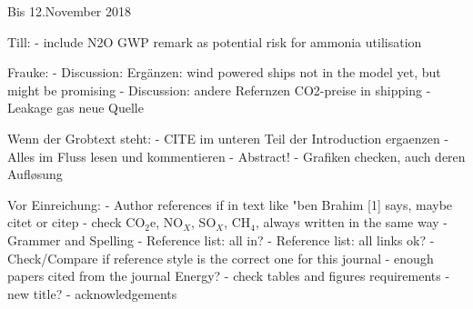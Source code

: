 Bis 12.November 2018

Till:
- include N2O GWP remark as potential risk for ammonia utilisation

Frauke:
- Discussion: Ergänzen: wind powered ships not in the model yet, but might be promising
- Discussion: andere Refernzen CO2-preise in shipping
- Leakage gas neue Quelle

Wenn der Grobtext steht:
- CITE im unteren Teil der Introduction ergaenzen
- Alles im Fluss lesen und kommentieren
- Abstract!
- Grafiken checken, auch deren Aufløsung


Vor Einreichung:
- Author references if in text like "ben Brahim [1] says, maybe citet or citep
- check CO$_2$e, NO$_X$, SO$_X$, CH$_4$, always written in the same way
- Grammer and Spelling
- Reference list: all in?
- Reference list: all links ok?
- Check/Compare if reference style is the correct one for this journal
- enough papers cited from the journal Energy?
- check tables and figures requirements
- new title?
- acknowledgements